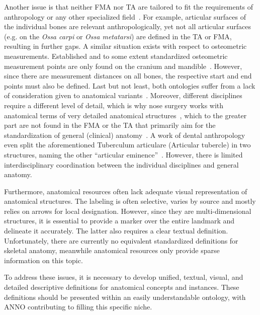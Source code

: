 \documentclass[sw]{iosart2x}
\begin{document}
Another issue is that neither FMA nor TA are tailored to fit the requirements of anthropology or any other specialized field~\citep{fma}.
For example, articular surfaces of the individual bones are relevant anthropologically, yet not all articular surfaces (e.g. on the \emph{Ossa carpi} or \emph{Ossa metatarsi}) are defined in the TA or FMA, resulting in further gaps.
A similar situation exists with respect to osteometric measurements.
Established and to some extent standardized osteometric measurement points are only found on the cranium and mandible~\citep{wesenanthropologie}.
 However, since there are measurement distances on all bones, the respective start and end points must also be defined.
Last but not least, both ontologies suffer from a lack of consideration given to anatomical variants~\citep{anatomycontribution}.
Moreover, different disciplines require a different level of detail, which is why nose surgery works with anatomical terms of very detailed anatomical structures~\citep{graysanatomy},
which to the greater part are not found in the FMA or the TA that primarily aim for the standardization of general (clinical) anatomy~\citep{fma}.
A work of dental anthropology even split the aforementioned Tuberculum articulare (Articular tubercle) in two structures, naming the other \enquote{articular eminence}~\citep{dentalanthropology}.
However, there is limited interdisciplinary coordination between the individual disciplines and general anatomy.

Furthermore, anatomical resources often lack adequate visual representation of anatomical structures.
The labeling is often selective, varies by source and mostly relies on arrows for local designation.
However, since they are multi-dimensional structures, it is essential to provide a marker over the entire landmark and delineate it accurately.
The latter also requires a clear textual definition.
Unfortunately, there are currently no equivalent standardized definitions for skeletal anatomy, meanwhile anatomical resources only provide sparse information on this topic.

To address these issues, it is necessary to develop unified, textual, visual, and detailed descriptive definitions for anatomical concepts and instances.
These definitions should be presented within an easily understandable ontology, with ANNO contributing to filling this specific niche.
\end{document}
